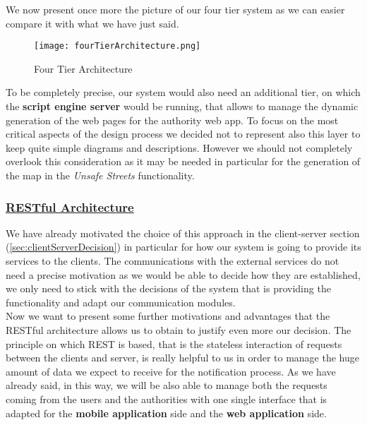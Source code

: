 			We now present once more the picture of our four tier system as we can easier compare it with what we have just said.
			
			\begin{figure}[h!]
				\centering
				\texttt{[image: fourTierArchitecture.png]}
				\caption{Four Tier Architecture}
			\end{figure}
		
			To be completely precise, our system would also need an additional tier, on which the \textbf{script engine server} would be running, that allows to manage the dynamic generation of  the web pages for the authority web app. To focus on the most critical aspects of the design process we decided not to represent also this layer to keep quite simple diagrams and descriptions. However we should not completely overlook this consideration as it may be needed in particular for the generation of the map in the \emph{Unsafe Streets} functionality.
			
		\subsubsection[RESTful Architecture]{\hyperlink{toc}{RESTful Architecture}}
			\label{sec:RESTDecision}
			
			We have already motivated the choice of this approach in the client-server section (\ref{sec:clientServerDecision}) in particular for how our system is going to provide its services to the clients. The communications with the external services do not need a precise motivation as we would be able to decide how they are established, we only need to stick with the decisions of the system that is providing the functionality and adapt our communication modules.\\
			
			Now we want to present some further motivations and advantages that the RESTful architecture allows us to obtain to justify even more our decision. The principle on which REST is based, that is the stateless interaction of requests between the clients and server, is really helpful to us in order to manage the huge amount of data we expect to receive for the notification process. As we have already said, in this way, we will be also able to manage both the requests coming from the users and the authorities with one single interface that is adapted for the \textbf{mobile application} side and the \textbf{web application} side.\\
			
